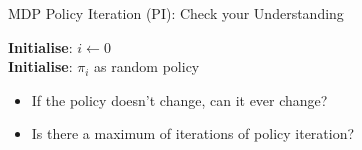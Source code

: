 \documentclass[aspectratio=169]{../latex_main/tntbeamer}  %
\begin{document}
\begin{frame}[c]{MDP Policy Iteration (PI): Check your Understanding}

\begin{algorithm}[H]
  \caption{Policy Iteration}
  \DontPrintSemicolon
  \textbf{Initialise}: $i \leftarrow 0$\\
  \textbf{Initialise}: $\pi_i$ as random policy\\
\end{algorithm}
\begin{itemize}
	\item \alert{If the policy doesn't change, can it ever change?}
	\item \alert{Is there a maximum of iterations of policy iteration?}
\end{itemize}

\end{frame}
\end{document}
